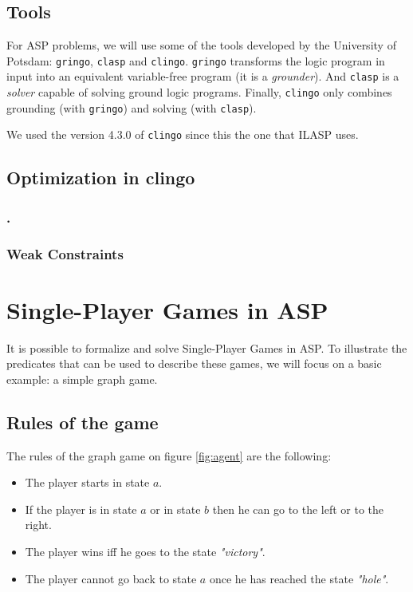 \subsection{Tools}

For ASP problems, we will use some of the tools developed by the University of Potsdam: \texttt{gringo}, \texttt{clasp} and \texttt{clingo}. \texttt{gringo} transforms the logic program in input into an equivalent variable-free program (it is a \textit{grounder}). And \texttt{clasp} is a \textit{solver} capable of solving ground logic programs. Finally, \texttt{clingo} only combines grounding (with \texttt{gringo}) and solving (with \texttt{clasp}).

\smallskip

We used the version 4.3.0 of \texttt{clingo} since this the one that ILASP uses.

\subsection{Optimization in clingo}



\subsubsection{.}


\subsubsection{Weak Constraints}



\section{Single-Player Games in ASP}

It is possible to formalize and solve Single-Player Games in ASP. To illustrate the predicates that can be used to describe these games, we will focus on a basic example: a simple graph game.


\subsection{Rules of the game}

The rules of the graph game on figure \ref{fig:agent} are the following:
\begin{itemize}
\item The player starts in state $a$.
\item If the player is in state $a$ or in state $b$ then he can go to the left or to the right.
\item The player wins iff he goes to the state \textit{"victory"}.
\item The player cannot go back to state $a$ once he has reached the state \textit{"hole"}.
\end{itemize}

